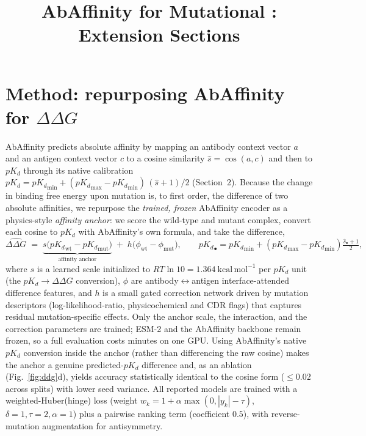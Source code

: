 \documentclass{article}
\title{\vspace{-2em}\bfseries AbAffinity for Mutational \ddg{}: Extension Sections}
\author{}\date{}
\newcommand{\ddg}{\ensuremath{\Delta\Delta G}}
\newcommand{\pkd}{\ensuremath{pK_d}}
\begin{document}
\maketitle\vspace{-3em}

\section{Method: repurposing AbAffinity for \ddg{}}
AbAffinity predicts absolute affinity by mapping an antibody context vector $a$ and an antigen context
vector $c$ to a cosine similarity $\hat s=\cos(a,c)$ and then to \pkd{} through its native calibration
$\pkd = {\pkd}_{\min} + ({\pkd}_{\max}-{\pkd}_{\min})\,(\hat s + 1)/2$ (Section~2). Because the change in binding
free energy upon mutation is, to first order, the difference of two absolute affinities, we repurpose the
\emph{trained, frozen} AbAffinity encoder as a physics-style \emph{affinity anchor}: we score the wild-type
and mutant complex, convert each cosine to \pkd{} with AbAffinity's own formula, and take the difference,
\begin{equation}
\widehat{\ddg} \;=\; \underbrace{s\big({\pkd}_{\mathrm{wt}}-{\pkd}_{\mathrm{mut}}\big)}_{\text{affinity anchor}}
\;+\; h\big(\phi_{\mathrm{wt}}-\phi_{\mathrm{mut}}\big),
\qquad
{\pkd}_\bullet = {\pkd}_{\min}+({\pkd}_{\max}-{\pkd}_{\min})\tfrac{\hat s_\bullet+1}{2},
\end{equation}
where $s$ is a learned scale initialized to $RT\ln 10 = 1.364\ \mathrm{kcal\,mol^{-1}}$ per \pkd{} unit (the
\pkd{}$\to$\ddg{} conversion), $\phi$ are antibody$\leftrightarrow$antigen interface-attended difference
features, and $h$ is a small gated correction network driven by mutation descriptors (log-likelihood-ratio,
physicochemical and CDR flags) that captures residual mutation-specific effects. Only the anchor scale, the
interaction, and the correction parameters are trained; ESM-2 and the AbAffinity backbone remain frozen, so
a full evaluation costs minutes on one GPU. Using AbAffinity's native \pkd{} conversion inside the anchor
(rather than differencing the raw cosine) makes the anchor a genuine predicted-\pkd{} difference and, as an
ablation (Fig.~\ref{fig:ddg}d), yields accuracy statistically identical to the cosine form ($\le 0.02$
across splits) with lower seed variance. All reported models are trained with a weighted-Huber(hinge) loss
(weight $w_k=1+\alpha\max(0,|y_k|-\tau)$, $\delta{=}1,\tau{=}2,\alpha{=}1$) plus a pairwise ranking term
(coefficient $0.5$), with reverse-mutation augmentation for antisymmetry.
\end{document}
